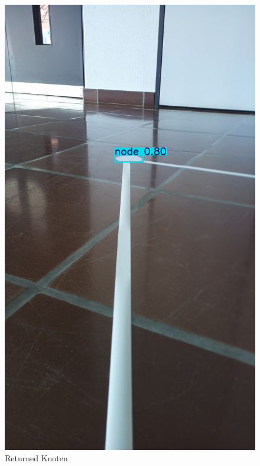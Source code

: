 \begin{figure}[H]
\begin{minipage}[b]{0.23\textwidth}
    \includegraphics[width=\textwidth]{assets/IT/testing/yolo/node_annot.png}
    \caption{Returned Knoten}
    \label{fig:expl-algo-2}
  \end{minipage}
    \hfill
  \begin{minipage}[b]{0.23\textwidth}
    \centering

\end{minipage}
\end{figure}
